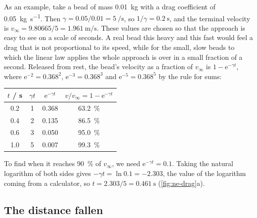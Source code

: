 As an example, take a bead of mass \SI{0.01}{\kilogram} with a drag
coefficient of \SI{0.05}{\kilogram\per\second}. Then $\gamma = 0.05/0.01
= \SI{5}{\per\second}$, so $1/\gamma = \SI{0.2}{\second}$, and the
terminal velocity is $v_\infty = 9.80665/5 = \SI{1.961}{\metre\per
\second}$. These values are chosen so that the approach is easy to see
on a scale of seconds. A real bead this heavy and this fast would feel a
drag that is not proportional to its speed, while for the small, slow
beads to which the linear law applies the whole approach is over in a
small fraction of a second. Released from rest, the bead's velocity as a
fraction of $v_\infty$ is $1 - \mathrm{e}^{-\gamma t}$, where
$\mathrm{e}^{-2} = 0.368^2$, $\mathrm{e}^{-3} = 0.368^3$ and
$\mathrm{e}^{-5} = 0.368^5$ by the rule for sums:
\begin{center}
\begin{tabular}{cccc}
\toprule
$t$ / \si{\second} & $\gamma t$ & $\mathrm{e}^{-\gamma t}$
   & $v/v_\infty = 1 - \mathrm{e}^{-\gamma t}$\\
\midrule
0.2 & 1 & 0.368 & \SI{63.2}{\percent}\\
0.4 & 2 & 0.135 & \SI{86.5}{\percent}\\
0.6 & 3 & 0.050 & \SI{95.0}{\percent}\\
1.0 & 5 & 0.007 & \SI{99.3}{\percent}\\
\bottomrule
\end{tabular}
\end{center}
To find when it reaches \SI{90}{\percent} of $v_\infty$, we need
$\mathrm{e}^{-\gamma t} = 0.1$. Taking the natural logarithm of both
sides gives $-\gamma t = \ln 0.1 = -2.303$, the value of the logarithm
coming from a calculator, so $t = 2.303/5 =
\SI{0.461}{\second}$ (\cref{fig:ne-drag}a).

\subsection*{The distance fallen}

